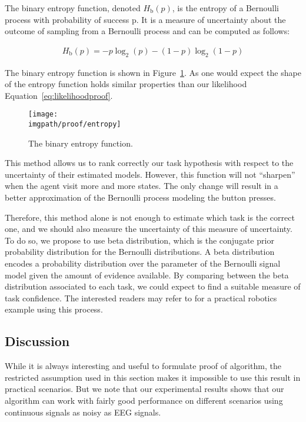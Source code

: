 The binary entropy function, denoted $H_{\mathrm b}(p)$, is the entropy of a Bernoulli process with probability of success p. It is a measure of uncertainty about the outcome of sampling from a Bernoulli process and can be computed as follows:

\begin{eqnarray}
H_{\mathrm b}(p) = -p\log_2(p) - (1-p)\log_2(1-p) 
\label{eq:likelihoodentropy}
\end{eqnarray}

The binary entropy function is shown in Figure~\ref{fig:prooflikelihoodentropy}. As one would expect the shape of the entropy function holds similar properties than our likelihood Equation~\ref{eq:likelihoodproof}.
    
\begin{figure}[!htbp]
\centering
\texttt{[image: \\imgpath/proof/entropy]}
\caption{The binary entropy function.}
\label{fig:prooflikelihoodentropy}
\end{figure}

This method allows us to rank correctly our task hypothesis with respect to the uncertainty of their estimated models. However, this function will not ``sharpen'' when the agent visit more and more states. The only change will result in a better approximation of the Bernoulli process modeling the button presses.

Therefore, this method alone is not enough to estimate which task is the correct one, and we should also measure the uncertainty of this measure of uncertainty. To do so, we propose to use beta distribution, which is the conjugate prior probability distribution for the Bernoulli distributions. A beta distribution encodes a probability distribution over the parameter of the Bernoulli signal model given the amount of evidence available. By comparing between the beta distribution associated to each task, we could expect to find a suitable measure of task confidence. The interested readers may refer to \cite{montesano2012active} for a practical robotics example using this process.

\subsection{Discussion}

While it is always interesting and useful to formulate proof of algorithm, the restricted assumption used in this section makes it impossible to use this result in practical scenarios. But we note that our experimental results shows that our algorithm can work with fairly good performance on different scenarios using continuous signals as noisy as EEG signals.

